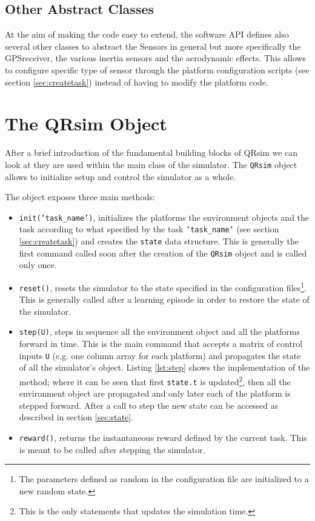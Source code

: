 \documentclass[a4paper,11pt]{report}
\newcommand{\sname}{QRsim\xspace}
\begin{document}
\subsection{Other Abstract Classes}

At the aim of making the code easy to extend, the software API defines also several other classes to abstract the Sensors in general but more specifically the GPSreceiver, the various inertia sensors and the aerodynamic effects. This allows to configure specific type of sensor through the platform configuration scripts (see section \ref{sec:createtask}) instead of having to modify the platform code.

\section{The \sname Object}\label{sec:qrobj}

After a brief introduction of the fundamental building blocks of \sname we can look at they are used within the main class of the simulator. The \texttt{\sname} object allows to initialize setup and control the simulator as a whole. 

The object exposes three main methods:
\begin{itemize}
 \item \texttt{init('task\_name')}, initializes the platforms the environment objects and the task according to what specified by the task \texttt{'task\_name'} (see section \ref{sec:createtask}) and creates the \texttt{state} data structure. This is generally the first command called soon after the creation of the \texttt{\sname} object and is called only once.
 \item \texttt{reset()}, resets the simulator to the state specified in the configuration files\footnote{The parameters defined as random in the configuration file are initialized to a new random state.}. This is generally called after a learning episode in order to restore the state of the simulator. 
 \item \texttt{step(U)}, steps in sequence all the environment object and all the platforms forward in time. This is the main command that accepts a matrix of control inputs \texttt{U} (e.g. one column array for each platform) and propagates the state of all the simulator's object. Listing \ref{lst:step} shows the implementation of the method; where it can be seen that first \texttt{state.t} is updated\footnote{This is the only statements that updates the simulation time.}, then all the environment object are propagated and only later each of the platform is stepped forward.
 After a call to step the new state can be accessed as described in section \ref{sec:state}.
 \item \texttt{reward()}, returns the instantaneous reward defined by the current task. This is meant to be called after stepping the simulator.
\end{itemize}
\end{document}
